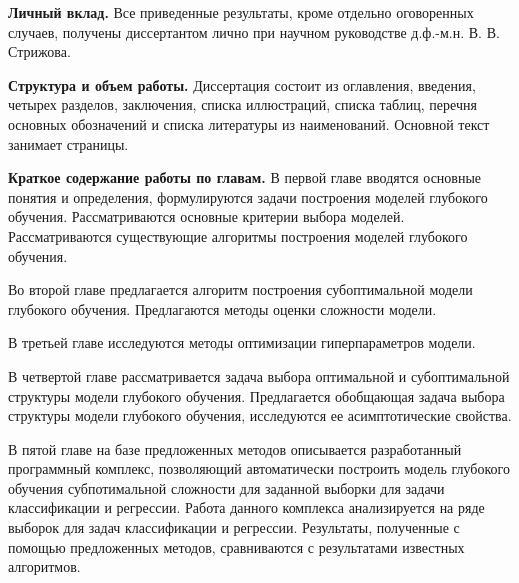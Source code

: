 \vspace{0.5cm}
\textbf{Личный вклад.} Все приведенные результаты, кроме отдельно оговоренных случаев, получены диссертантом лично при научном руководстве д.ф.-м.н. В. В. Стрижова.


\vspace{0.5cm}
\textbf{Структура и объем работы.} Диссертация состоит из оглавления, введения, четырех разделов, заключения, списка иллюстраций, списка таблиц, перечня основных обозначений и списка литературы из  наименований. Основной текст занимает \pageref{LastPage} страницы.

\vspace{0.5cm}
\textbf{Краткое содержание работы по главам.} В первой главе вводятся основные понятия и определения, формулируются задачи построения моделей глубокого обучения. Рассматриваются основные критерии выбора моделей. Рассматриваются существующие алгоритмы построения моделей глубокого обучения.

Во второй главе предлагается алгоритм построения субоптимальной модели глубокого обучения. Предлагаются методы оценки сложности модели.

В третьей главе исследуются методы оптимизации гиперпараметров модели.

В четвертой главе рассматривается задача выбора оптимальной и субоптимальной структуры модели глубокого обучения. Предлагается обобщающая задача выбора структуры модели глубокого обучения, исследуются ее асимптотические свойства. 

В пятой главе на базе предложенных методов описывается разработанный программный комплекс, позволяющий автоматически построить модель глубокого обучения субпотимальной сложности для заданной выборки для задачи классификации и регрессии. Работа данного комплекса анализируется на ряде выборок для задач классификации и регрессии. Результаты, полученные с помощью предложенных методов, сравниваются с результатами известных алгоритмов.


